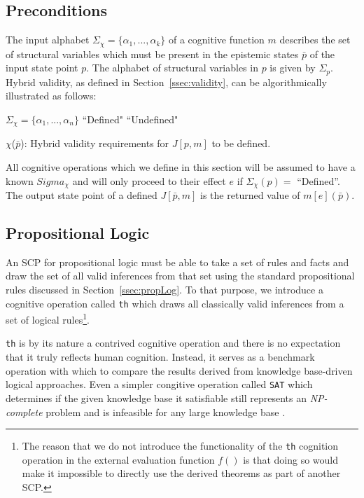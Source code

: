 \subsection{Preconditions}

The input alphabet $\Sigma_\chi=\{\alpha_1, ..., \alpha_k\}$ of a cognitive function $m$ describes the set of structural variables which must be present in the epistemic states $\bar{p}$ of the input state point $p$. The alphabet of structural variables in $p$ is given by $\Sigma_p$. Hybrid validity, as defined in Section~\ref{ssec:validity}, can be algorithmically illustrated as follows:

\begin{algorithm}[H] \label{cogOp:precon}
\SetAlgoLined
{}
{
$\Sigma_{\chi}=\{\alpha_1,...,\alpha_n\}$\;
{
\Return ``Defined"
}
{
\Return ``Undefined"
}
}

\caption{$\chi$($\bar{p}$): Hybrid validity requirements for $J[p,m]$ to be defined.}
\end{algorithm}

All cognitive operations which we define in this section will be assumed to have a known $Sigma_\chi$ and will only proceed to their effect $e$ if $\Sigma_{\chi}(p)=$ ``Defined''.
The output state point of a defined $J[\bar{p},m]$ is the returned value of $m[e](\bar{p})$.

\subsection{Propositional Logic}
An SCP for propositional logic must be able to take a set of rules and facts and draw the set of all valid inferences from that set using the standard propositional rules discussed in Section~\ref{ssec:propLog}. To that purpose, we introduce a cognitive operation called \texttt{th} which draws all classically valid inferences from a set of logical rules\footnote{The reason that we do not introduce the functionality of the \texttt{th} cognition operation in the external evaluation function $f()$ is that doing so would make it impossible to directly use the derived theorems as part of another SCP.}.

\texttt{th} is by its nature a contrived cognitive operation and there is no expectation that it truly reflects human cognition. Instead, it serves as a benchmark operation with which to compare the results derived from knowledge base-driven logical approaches. Even a simpler congitive operation called \texttt{SAT} which determines if the given knowledge base it satisfiable still represents an \textit{NP-complete}  problem and is infeasible for any large knowledge base \citep{schaefer1978complexity}.

